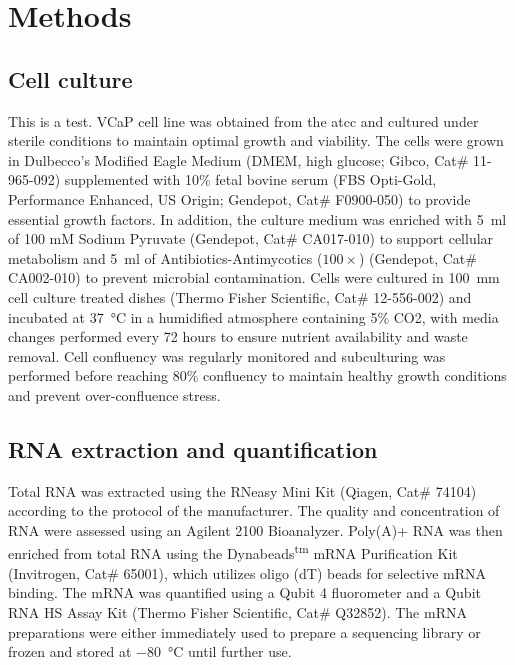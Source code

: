 \documentclass[pdflatex,sn-nature, lineno]{sn-jnl}%
\begin{document}
\section{Methods}\label{sec:methods}


\subsection{Cell culture}

This is a test. VCaP cell line was obtained from the \gls{atcc} and cultured under sterile conditions to maintain optimal growth and viability.
The cells were grown in Dulbecco's Modified Eagle Medium (DMEM, high glucose; Gibco, Cat\# 11-965-092) supplemented with 10\% fetal bovine serum (FBS Opti-Gold, Performance Enhanced, US Origin; Gendepot, Cat\# F0900-050) to provide essential growth factors.
In addition, the culture medium was enriched with \SI{5}{\ml} of 100 mM Sodium Pyruvate (Gendepot, Cat\# CA017-010) to support cellular metabolism and \SI{5}{\ml} of Antibiotics-Antimycotics (\( 100\times \)) (Gendepot, Cat\# CA002-010) to prevent microbial contamination.
Cells were cultured in \SI{100}{\mm} cell culture treated dishes (Thermo Fisher Scientific, Cat\# 12-556-002) and incubated at \SI{37}{\degreeCelsius} in a humidified atmosphere containing 5\% CO2, with media changes performed every 72 hours to ensure nutrient availability and waste removal.
Cell confluency was regularly monitored and subculturing was performed before reaching 80\% confluency to maintain healthy growth conditions and prevent over-confluence stress.

\subsection{RNA extraction and quantification}

Total RNA was extracted using the RNeasy Mini Kit (Qiagen, Cat\# 74104) according to the protocol of the manufacturer.
The quality and concentration of RNA were assessed using an Agilent 2100 Bioanalyzer.
Poly(A)+ RNA was then enriched from total RNA using the Dynabeads\textsuperscript{tm} mRNA Purification Kit (Invitrogen, Cat\# 65001), which utilizes oligo (dT) beads for selective mRNA binding.
The mRNA was quantified using a Qubit 4 fluorometer and a Qubit RNA HS Assay Kit (Thermo Fisher Scientific, Cat\# Q32852).
The mRNA preparations were either immediately used to prepare a sequencing library or frozen and stored at \SI{-80}{\degreeCelsius} until further use.
\end{document}
